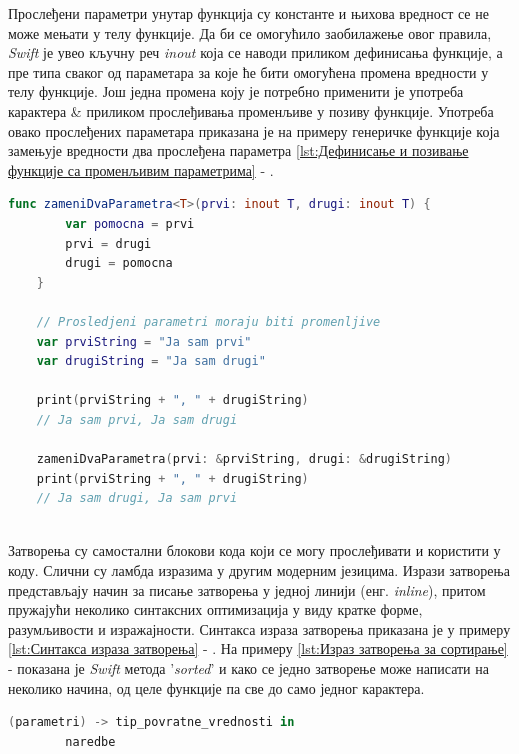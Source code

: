 \documentclass[12pt,oneside]{memoir}
\begin{document}
\indent Прослеђени параметри унутар функција су константе и њихова вредност се не може мењати у телу функције. Да би се омогућило заобилажење овог правила, \textit{Swift} је увео кључну реч \textit{inout} која се наводи приликом дефинисања функције, а пре типа сваког од параметара за које ће бити омогућена промена вредности у телу функције. Још једна промена коју је потребно применити је употреба карактера \& приликом прослеђивања променљиве у позиву функције. Употреба овако прослеђених параметара приказана је на примеру генеричке функције која замењује вредности два прослеђена параметра \ref{lst:Дефинисање и позивање функције са променљивим параметрима} - . 

\begin{lstlisting}[caption=\textit{{Дефинисање и позивање функције са променљивим параметрима}}, label={lst:Дефинисање и позивање функције са променљивим параметрима}, language=Swift, frame=single]
    func zameniDvaParametra<T>(prvi: inout T, drugi: inout T) {
        var pomocna = prvi
        prvi = drugi
        drugi = pomocna
    }
    
    // Prosledjeni parametri moraju biti promenljive
    var prviString = "Ja sam prvi"
    var drugiString = "Ja sam drugi"
    
    print(prviString + ", " + drugiString)
    // Ja sam prvi, Ja sam drugi
    
    zameniDvaParametra(prvi: &prviString, drugi: &drugiString)
    print(prviString + ", " + drugiString)
    // Ja sam drugi, Ja sam prvi
    
\end{lstlisting}

\indent Затворења су самостални блокови кода који се могу прослеђивати и користити у коду. Слични су ламбда изразима у другим модерним језицима. Изрази затворења представљају начин за писање затворења у једној линији (енг. \textit{inline}), притом пружајући неколико синтаксних оптимизација у виду кратке форме, разумљивости и изражајности. Синтакса израза затворења приказана је у примеру \ref{lst:Синтакса израза затворења} - . На примеру \ref{lst:Израз затворења за сортирање} -  показана је \textit{Swift} метода '\textit{sorted}' и како се једно затворење може написати на неколико начина, од целе функције па све до само једног карактера.

\begin{lstlisting}[caption=\textit{{Синтакса израза затворења}}, label={lst:Синтакса израза затворења}, language=Swift, frame=single]
    (parametri) -> tip_povratne_vrednosti in
        naredbe
\end{lstlisting}
\end{document}
